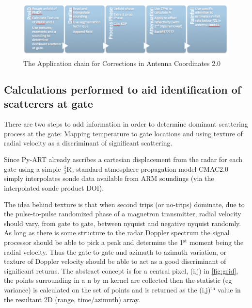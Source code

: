 \documentclass[twocol]{ametsoc}
\begin{document}
\begin{figure}[h]
    \centering
    \includegraphics[width=0.9\columnwidth]{application_chain.png}
    \caption{The Application chain for Corrections in Antenna Coordinates 2.0}
     \label{fig:chain}
\end{figure}


\subsection{Calculations performed to aid identification of scatterers at gate}
\label{ssec:precalc}
There are two steps to add information in order to determine 
dominant scattering process at the gate:
 Mapping temperature to gate locations and using texture of 
 radial velocity as a discriminant of significant scattering. 

Since Py-ART already ascribes a cartesian displacement 
from the radar for each gate using a simple
 $\mathrm{\frac{4}{3}R_e}$ standard atmosphere 
 propagation model CMAC2.0 simply interpolates
  sonde data available from ARM soundings (via the
   interpolated sonde product DOI). 

The idea behind texture is that when second trips (or no-trips) dominate, due to the pulse-to-pulse 
randomized phase of a magnetron transmitter, radial velocity should vary, from gate to gate, between
 nyquist and negative nyquist randomly. As long as there is some structure to the radar Doppler spectrum
  the signal processor should be able to pick a peak and determine the 1$\mathrm{^{st}}$ moment 
  being the radial velocity. Thus the gate-to-gate and azimuth to azimuth variation, or texture of Doppler 
  velocity should be able to act as a good discriminant of significant returns.
  The abstract concept is for a central pixel, (i,j) in \ref{fig:grid},
 the points surrounding in a n by m kernel are collected
 then the statistic (eg variance) is calculated on the set of 
 points and is returned as the (i,j)$\mathrm{^{th}}$ value in 
 the resultant 2D (range, time/azimuth) array. 
\end{document}
